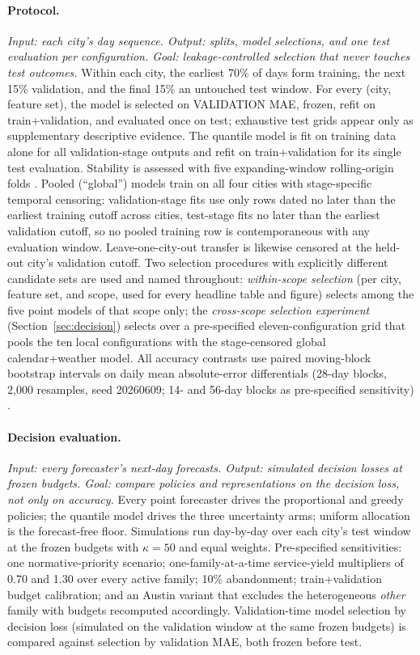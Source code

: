 \paragraph{Protocol.}
\emph{Input: each city's day sequence. Output: splits, model selections,
and one test evaluation per configuration. Goal: leakage-controlled
selection that never touches test outcomes.}
Within each city, the earliest 70\% of days form training, the next 15\%
validation, and the final 15\% an untouched test window. For every (city,
feature set), the model is selected on VALIDATION MAE, frozen, refit on
train+validation, and evaluated once on test; exhaustive test grids
appear only as supplementary descriptive evidence. The quantile model is
fit on training data alone for all validation-stage outputs and refit on
train+validation for its single test evaluation. Stability is assessed
with five expanding-window rolling-origin folds
\citep{hyndman2021forecasting}. Pooled (``global'') models train on all
four cities with stage-specific temporal censoring: validation-stage fits
use only rows dated no later than the earliest training cutoff across
cities, test-stage fits no later than the earliest validation cutoff, so
no pooled training row is contemporaneous with any evaluation window.
Leave-one-city-out transfer is likewise censored at the held-out city's
validation cutoff. Two selection procedures with explicitly different
candidate sets are used and named throughout: \emph{within-scope
selection} (per city, feature set, and scope, used for every headline
table and figure) selects among the five point models of that scope
only; the \emph{cross-scope selection experiment} (Section~\ref{sec:decision}) selects
over a pre-specified eleven-configuration grid that pools the ten local
configurations with the stage-censored global calendar+weather model. All accuracy contrasts use paired moving-block
bootstrap intervals on daily mean absolute-error differentials (28-day
blocks, 2{,}000 resamples, seed 20260609; 14- and 56-day blocks as
pre-specified sensitivity) \citep[in the spirit of][]{diebold1995comparing}.

\paragraph{Decision evaluation.}
\emph{Input: every forecaster's next-day forecasts. Output: simulated
decision losses at frozen budgets. Goal: compare policies and
representations on the decision loss, not only on accuracy.}
Every point forecaster drives the proportional and greedy policies; the
quantile model drives the three uncertainty arms; uniform allocation is
the forecast-free floor. Simulations run day-by-day over each city's test
window at the frozen budgets with $\kappa = 50$ and equal weights.
Pre-specified sensitivities: one normative-priority scenario;
one-family-at-a-time service-yield multipliers of 0.70 and 1.30 over
every active family; 10\% abandonment; train+validation budget
calibration; and an Austin variant that excludes the heterogeneous
\emph{other} family with budgets recomputed accordingly. Validation-time
model selection by decision loss (simulated on the validation window at
the same frozen budgets) is compared against selection by validation MAE,
both frozen before test.

